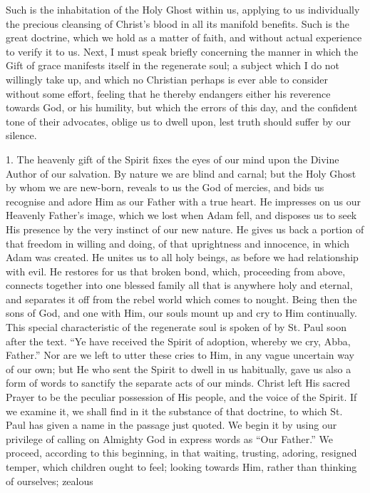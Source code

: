 Such is the inhabitation of the Holy Ghost within us, applying to us
individually the precious cleansing of Christ's blood in all its
manifold benefits. Such is the great doctrine, which we hold as a matter
of faith, and without actual experience to verify it to us. Next, I must
speak briefly concerning the manner in which the Gift of grace manifests
itself in the regenerate soul; a subject which I do not willingly take
up, and which no Christian perhaps is ever able to consider without some
effort, feeling that he thereby endangers either his reverence towards
God, or his humility, but which the errors of this day, and the
confident tone of their advocates, oblige us to dwell upon, lest truth
should suffer by our silence.

1. The heavenly gift of the Spirit fixes the eyes of our mind upon
the Divine Author of our salvation. By nature we are blind and carnal;
but the Holy Ghost by whom we are new-born, reveals to us the God of
mercies, and bids us recognise and adore Him as our Father with a true
heart. He impresses on us our Heavenly Father's image, which we lost
when Adam fell, and disposes us to seek His presence by the very
instinct of our new nature. He gives us back a portion of that freedom
in willing and doing, of that uprightness and innocence, in which Adam
was created. He unites us to all holy beings, as before we had
relationship with evil. He restores for us that broken bond, which,
proceeding from above, connects together into one blessed family all
that is anywhere holy and eternal, and separates it off from the rebel
world which comes to nought. Being then the sons of God, and one with
Him, our souls mount up and cry to Him continually. This special
characteristic of the regenerate soul is spoken of by St. Paul soon
after the text. ``Ye have received the Spirit of adoption, whereby
we cry, Abba, Father.'' Nor are we left to utter these cries to Him,
in any vague uncertain way of our own; but He who sent the Spirit to
dwell in us habitually, gave us also a form of words to sanctify the
separate acts of our minds. Christ left His sacred Prayer to be the
peculiar possession of His people, and the voice of the Spirit. If we
examine it, we shall find in it the substance of that doctrine, to which
St. Paul has given a name in the passage just quoted. We begin it by
using our privilege of calling on Almighty God in express words as
``Our Father.'' We proceed, according to this beginning, in that
waiting, trusting, adoring, resigned temper, which children ought to
feel; looking towards Him, rather than thinking of ourselves; zealous
